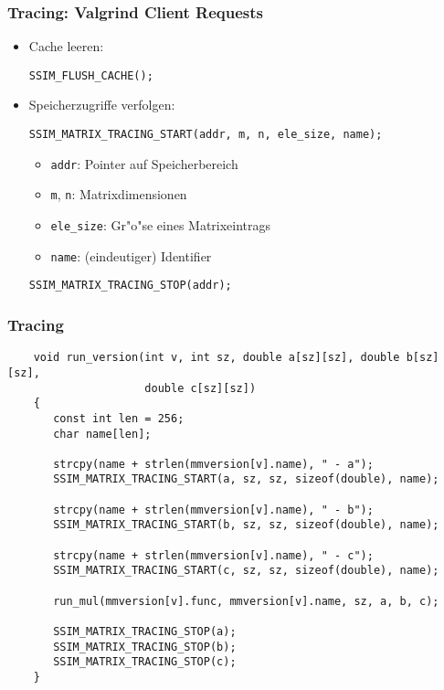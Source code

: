 \begin{frame} [fragile] \frametitle{Tracing: Valgrind Client Requests}
	\begin{itemize}
	
	\item Cache leeren:
	\begin{lstlisting}[numbers=none]
	SSIM_FLUSH_CACHE();
	\end{lstlisting}
	
	\item<2-> Speicherzugriffe verfolgen:
	\begin{lstlisting}[numbers=none]
	SSIM_MATRIX_TRACING_START(addr, m, n, ele_size, name);
	\end{lstlisting}
	\begin{itemize}
		\item \verb|addr|: Pointer auf Speicherbereich
		\item \verb|m|, \verb|n|: Matrixdimensionen
		\item \verb|ele_size|: Gr"o"se eines Matrixeintrags
		\item \verb|name|: (eindeutiger) Identifier
	\end{itemize}
	
	\begin{lstlisting}[numbers=none]
	SSIM_MATRIX_TRACING_STOP(addr);
	\end{lstlisting}
	
	\end{itemize}
\end{frame}

\begin{frame} [fragile] \frametitle{Tracing}
	\begin{lstlisting}
	void run_version(int v, int sz, double a[sz][sz], double b[sz][sz], 
	                 double c[sz][sz])
	{
	   const int len = 256;
	   char name[len];
	   
	   strcpy(name + strlen(mmversion[v].name), " - a");
	   SSIM_MATRIX_TRACING_START(a, sz, sz, sizeof(double), name);

	   strcpy(name + strlen(mmversion[v].name), " - b");
	   SSIM_MATRIX_TRACING_START(b, sz, sz, sizeof(double), name);

	   strcpy(name + strlen(mmversion[v].name), " - c");
	   SSIM_MATRIX_TRACING_START(c, sz, sz, sizeof(double), name);

	   run_mul(mmversion[v].func, mmversion[v].name, sz, a, b, c);

	   SSIM_MATRIX_TRACING_STOP(a);
	   SSIM_MATRIX_TRACING_STOP(b);
	   SSIM_MATRIX_TRACING_STOP(c);
	}
	\end{lstlisting}
\end{frame}

